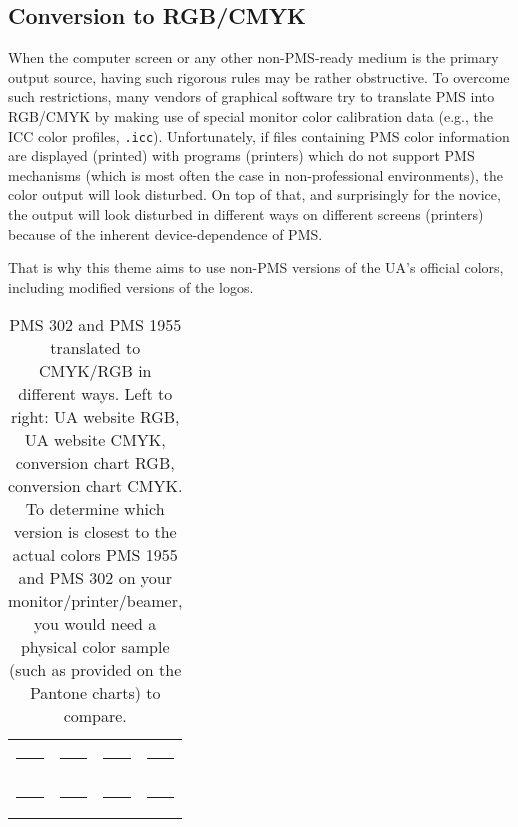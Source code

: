 \documentclass[a4paper,10pt]{article}
\begin{document}
\subsection{Conversion to RGB/CMYK}

When the computer screen or any other non-PMS-ready medium is the primary output source, having such rigorous rules may be rather obstructive. To overcome such restrictions, many vendors of graphical software try to translate PMS into RGB/CMYK by making use of special monitor color calibration data (e.g., the ICC color profiles, \lstinline!.icc!). Unfortunately, if files containing PMS color information are displayed (printed) with programs (printers) which do not support PMS mechanisms (which is most often the case in non-professional environments), the color output will look disturbed. On top of that, and surprisingly for the novice, the output will look disturbed in different ways on different screens (printers) because of the inherent device-dependence of PMS.

That is why this theme aims to use non-PMS versions of the UA's official colors, including modified versions of the logos.

\begin{table}
\centering
\newlength{\boxsize}
\setlength{\boxsize}{2cm}

\begin{tabular}{cccc}
\definecolor{ugentblue11}{RGB}{  0, 61,100}
\colorbox{ugentblue11}{\rule{0mm}{\boxsize}\rule{\boxsize}{0mm}}
&
\definecolor{ugentblue12}{cmyk}{1,0.3,0,0.62}
\colorbox{ugentblue12}{\rule{0mm}{\boxsize}\rule{\boxsize}{0mm}}
&
\definecolor{ugentblue13}{RGB}{0,96,128}
\colorbox{ugentblue13}{\rule{0mm}{\boxsize}\rule{\boxsize}{0mm}}
&
\definecolor{ugentblue14}{cmyk}{1,0.25,0,0.5}
\colorbox{ugentblue14}{\rule{0mm}{\boxsize}\rule{\boxsize}{0mm}}\\[2mm]
\definecolor{ugentyellow11}{RGB}{126,  0, 47}
\colorbox{ugentyellow11}{\rule{0mm}{\boxsize}\rule{\boxsize}{0mm}}
&
\definecolor{ugentyellow11}{cmyk}{0,1,0.54,0.46}
\colorbox{ugentyellow11}{\rule{0mm}{\boxsize}\rule{\boxsize}{0mm}}
&
\definecolor{ugentyellow11}{RGB}{161,0,64}
\colorbox{ugentyellow11}{\rule{0mm}{\boxsize}\rule{\boxsize}{0mm}}
&
\definecolor{ugentyellow11}{cmyk}{0,1,0.6,0.37}
\colorbox{ugentyellow11}{\rule{0mm}{\boxsize}\rule{\boxsize}{0mm}}
\end{tabular}

\caption{PMS 302 and PMS 1955 translated to CMYK/RGB in different ways. Left to right: UA website \cite{KAN::} RGB, UA website \cite{KAN::} CMYK, conversion chart \cite{::TDC} RGB, conversion chart \cite{::TDC} CMYK. To determine which version is closest to the actual colors PMS 1955 and PMS 302 on your monitor/printer/beamer, you would need a physical color sample (such as provided on the Pantone\textsuperscript{\textregistered} charts) to compare.}
\label{table:reds-blues}
\end{table}
\end{document}
